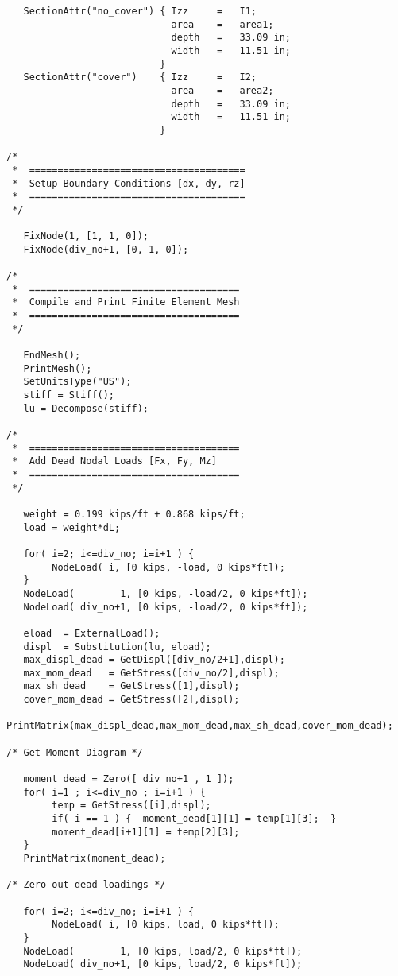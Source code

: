 \begin{footnotesize}
\begin{verbatim}
   SectionAttr("no_cover") { Izz     =   I1;
                             area    =   area1;
                             depth   =   33.09 in;
                             width   =   11.51 in;
                           }
   SectionAttr("cover")    { Izz     =   I2;
                             area    =   area2;
                             depth   =   33.09 in;
                             width   =   11.51 in;
                           }

/* 
 *  ======================================
 *  Setup Boundary Conditions [dx, dy, rz]
 *  ======================================
 */ 

   FixNode(1, [1, 1, 0]);
   FixNode(div_no+1, [0, 1, 0]);

/* 
 *  =====================================
 *  Compile and Print Finite Element Mesh 
 *  =====================================
 */ 

   EndMesh();
   PrintMesh();
   SetUnitsType("US");
   stiff = Stiff();
   lu = Decompose(stiff);

/* 
 *  =====================================
 *  Add Dead Nodal Loads [Fx, Fy, Mz]
 *  =====================================
 */ 

   weight = 0.199 kips/ft + 0.868 kips/ft;
   load = weight*dL;
      
   for( i=2; i<=div_no; i=i+1 ) {
        NodeLoad( i, [0 kips, -load, 0 kips*ft]);
   }
   NodeLoad(        1, [0 kips, -load/2, 0 kips*ft]);
   NodeLoad( div_no+1, [0 kips, -load/2, 0 kips*ft]);

   eload  = ExternalLoad();
   displ  = Substitution(lu, eload);
   max_displ_dead = GetDispl([div_no/2+1],displ);
   max_mom_dead   = GetStress([div_no/2],displ);
   max_sh_dead    = GetStress([1],displ);
   cover_mom_dead = GetStress([2],displ);
   PrintMatrix(max_displ_dead,max_mom_dead,max_sh_dead,cover_mom_dead);

/* Get Moment Diagram */

   moment_dead = Zero([ div_no+1 , 1 ]);
   for( i=1 ; i<=div_no ; i=i+1 ) {
        temp = GetStress([i],displ);
        if( i == 1 ) {  moment_dead[1][1] = temp[1][3];  }
        moment_dead[i+1][1] = temp[2][3];
   }
   PrintMatrix(moment_dead);

/* Zero-out dead loadings */

   for( i=2; i<=div_no; i=i+1 ) {
        NodeLoad( i, [0 kips, load, 0 kips*ft]);
   }
   NodeLoad(        1, [0 kips, load/2, 0 kips*ft]);
   NodeLoad( div_no+1, [0 kips, load/2, 0 kips*ft]);


\end{verbatim}
\end{footnotesize}
